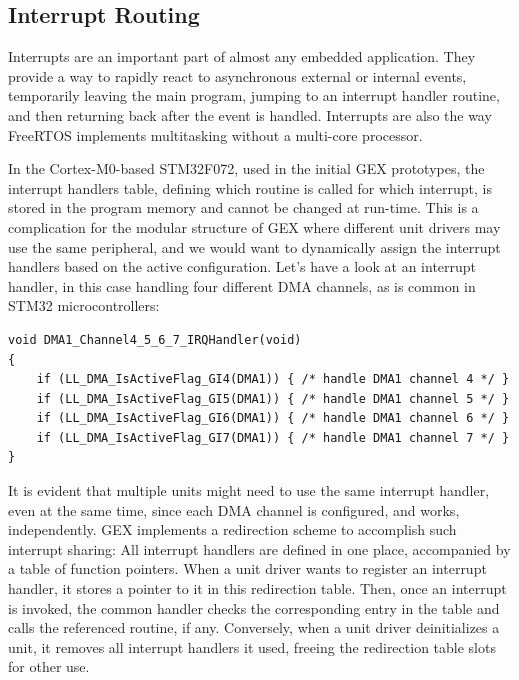 \subsection{Interrupt Routing} \label{sec:irq-routing}

Interrupts are an important part of almost any embedded application. They provide a way to rapidly react to asynchronous external or internal events, temporarily leaving the main program, jumping to an interrupt handler routine, and then returning back after the event is handled. Interrupts are also the way FreeRTOS implements multitasking without a multi-core processor.

In the Cortex-M0-based STM32F072, used in the initial GEX prototypes, the interrupt handlers table, defining which routine is called for which interrupt, is stored in the program memory and cannot be changed at run-time. This is a complication for the modular structure of GEX where different unit drivers may use the same peripheral, and we would want to dynamically assign the interrupt handlers based on the active configuration. Let's have a look at an interrupt handler, in this case handling four different \gls{DMA} channels, as is common in STM32 microcontrollers:

\begin{verbatim}
void DMA1_Channel4_5_6_7_IRQHandler(void)
{
    if (LL_DMA_IsActiveFlag_GI4(DMA1)) { /* handle DMA1 channel 4 */ }
    if (LL_DMA_IsActiveFlag_GI5(DMA1)) { /* handle DMA1 channel 5 */ }
    if (LL_DMA_IsActiveFlag_GI6(DMA1)) { /* handle DMA1 channel 6 */ }
    if (LL_DMA_IsActiveFlag_GI7(DMA1)) { /* handle DMA1 channel 7 */ }
}
\end{verbatim}

It is evident that multiple units might need to use the same interrupt handler, even at the same time, since each \gls{DMA} channel is configured, and works, independently. GEX implements a redirection scheme to accomplish such interrupt sharing: All interrupt handlers are defined in one place, accompanied by a table of function pointers. When a unit driver wants to register an interrupt handler, it stores a pointer to it in this redirection table. Then, once an interrupt is invoked, the common handler checks the corresponding entry in the table and calls the referenced routine, if any. Conversely, when a unit driver deinitializes a unit, it removes all interrupt handlers it used, freeing the redirection table slots for other use.











